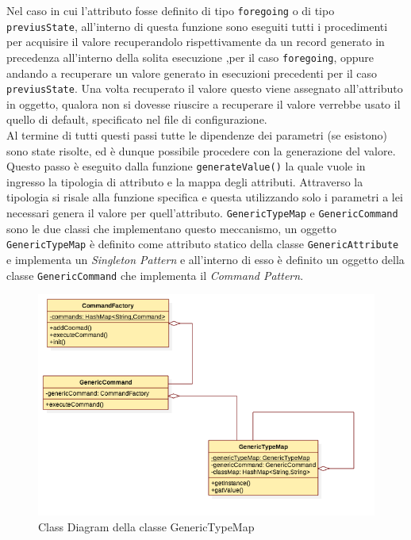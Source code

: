 \documentclass[12pt,a4paper,italian]{article}
\begin{document}
		Nel caso in cui l'attributo fosse definito di tipo \texttt{foregoing}  o di tipo \\ \texttt{previusState}, all'interno di questa funzione sono eseguiti tutti i procedimenti per acquisire il valore recuperandolo rispettivamente da un record generato in precedenza all'interno della solita esecuzione ,per il caso \texttt{foregoing}, oppure andando a recuperare un valore generato in esecuzioni precedenti per il caso \texttt{previusState}. Una volta recuperato il valore questo viene assegnato all'attributo in oggetto, qualora non si dovesse riuscire a recuperare il valore verrebbe usato il quello di default, specificato nel file di configurazione.\\
		\newline
		Al termine di tutti questi passi tutte le dipendenze dei parametri (se esistono) sono state risolte, ed è dunque possibile procedere con la generazione del valore.
		Questo passo è eseguito dalla funzione \texttt{generateValue()} la quale vuole in ingresso la tipologia di attributo e la mappa degli attributi. Attraverso la tipologia si risale alla funzione specifica e questa utilizzando solo i parametri a lei necessari genera il valore per quell'attributo.
		\texttt{GenericTypeMap} e \texttt{GenericCommand} sono le due classi che implementano questo meccanismo, un oggetto \texttt{GenericTypeMap} è definito come attributo statico della classe \texttt{GenericAttribute} e implementa un \emph{Singleton Pattern} e all'interno di esso è definito un oggetto della classe \texttt{GenericCommand} che implementa il \emph{Command Pattern}.
		
			
			\begin{figure}[h!]
				\centering
				\includegraphics[width=14cm]{img/genericCommand.png}
				\caption{Class Diagram della classe GenericTypeMap}\label{genericTypeMap}
			\end{figure}
		
\end{document}
